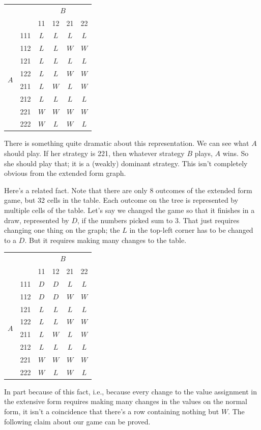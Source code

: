 \documentclass[openany]{book}
\begin{document}
\begin{center}
\begin{tabular}{l r | c c c c}
& & \multicolumn{4}{c}{$B$} \\
& & 11 & 12 & 21 & 22 \\ \hline
\multirow{8}{*}{$A$} &
  111 & $L$ & $L$ &  $L$ & $L$\\
& 112 & $L$ & $L$ &  $W$ & $W$\\
& 121 & $L$ & $L$ &  $L$ & $L$\\
& 122 & $L$ & $L$ &  $W$ & $W$\\
& 211 & $L$ & $W$ &  $L$ & $W$\\
& 212 & $L$ & $L$ &  $L$ & $L$\\
& 221 & $W$ & $W$ &  $W$ & $W$\\
& 222 & $W$ & $L$ &  $W$ & $L$
\end{tabular}
\end{center}
There is something quite dramatic about this representation. We can see what $A$ should play. If her strategy is 221, then whatever strategy $B$ plays, $A$ wins. So she should play that; it is a (weakly) dominant strategy. This isn't completely obvious from the extended form graph. 

Here's a related fact. Note that there are only 8 outcomes of the extended form game, but 32 cells in the table. Each outcome on the tree is represented by multiple cells of the table. Let's say we changed the game so that it finishes in a draw, represented by $D$, if the numbers picked sum to 3. That just requires changing one thing on the graph; the $L$ in the top-left corner has to be changed to a $D$. But it requires making many changes to the table.

\begin{center}
\begin{tabular}{l r | c c c c}
& & \multicolumn{4}{c}{$B$} \\
& & 11 & 12 & 21 & 22 \\ \hline
\multirow{8}{*}{$A$} &
  111 & $D$ & $D$ &  $L$ & $L$\\
& 112 & $D$ & $D$ &  $W$ & $W$\\
& 121 & $L$ & $L$ &  $L$ & $L$\\
& 122 & $L$ & $L$ &  $W$ & $W$\\
& 211 & $L$ & $W$ &  $L$ & $W$\\
& 212 & $L$ & $L$ &  $L$ & $L$\\
& 221 & $W$ & $W$ &  $W$ & $W$\\
& 222 & $W$ & $L$ &  $W$ & $L$
\end{tabular}
\end{center}
In part because of this fact, i.e., because every change to the value assignment in the extensive form requires making many changes in the values on the normal form, it isn't a coincidence that there's a row containing nothing but $W$. The following claim about our game can be proved.
\end{document}
